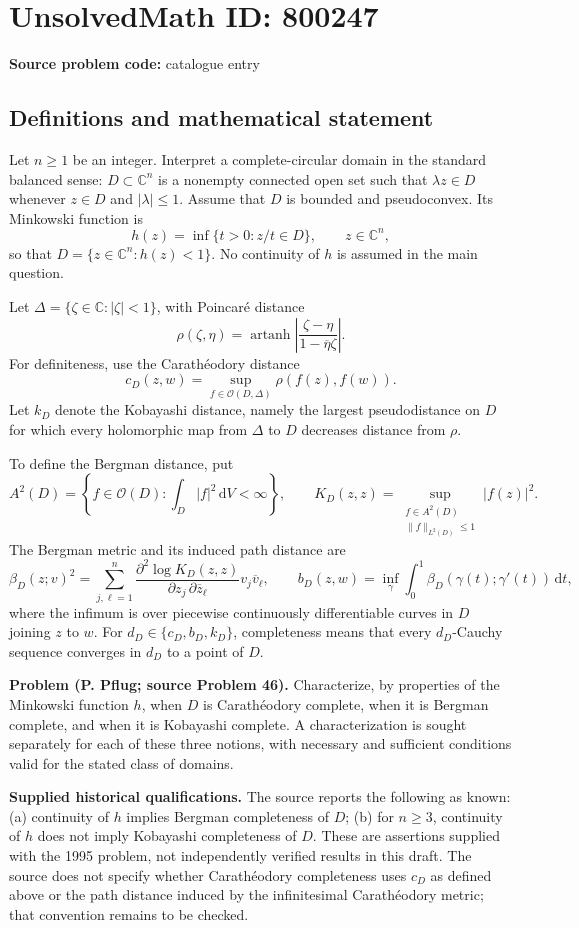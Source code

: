\documentclass[11pt]{article}
\newcommand{\C}{\mathbb{C}}
\begin{document}
\section*{UnsolvedMath ID: 800247}
\textbf{Source problem code:} catalogue entry
\subsection{Definitions and mathematical statement}
Let \(n\geq 1\) be an integer. Interpret a complete-circular domain in the standard balanced sense: \(D\subset\C^n\) is a nonempty connected open set such that \(\lambda z\in D\) whenever \(z\in D\) and \(|\lambda|\leq 1\). Assume that \(D\) is bounded and pseudoconvex. Its Minkowski function is
\[
h(z)=\inf\{t>0:z/t\in D\},\qquad z\in\C^n,
\]
so that \(D=\{z\in\C^n:h(z)<1\}\). No continuity of \(h\) is assumed in the main question.

Let \(\Delta=\{\zeta\in\C:|\zeta|<1\}\), with Poincar\'e distance
\[
\rho(\zeta,\eta)=\operatorname{artanh}\left|\frac{\zeta-\eta}{1-\overline\eta\zeta}\right|.
\]
For definiteness, use the Carath\'eodory distance
\[
c_D(z,w)=\sup_{f\in\mathcal O(D,\Delta)}\rho(f(z),f(w)).
\]
Let \(k_D\) denote the Kobayashi distance, namely the largest pseudodistance on \(D\) for which every holomorphic map from \(\Delta\) to \(D\) decreases distance from \(\rho\).

To define the Bergman distance, put
\[
A^2(D)=\left\{f\in\mathcal O(D):\int_D|f|^2\,\mathrm dV<\infty\right\},\qquad
K_D(z,z)=\sup_{\substack{f\in A^2(D)\\ \|f\|_{L^2(D)}\leq 1}}|f(z)|^2.
\]
The Bergman metric and its induced path distance are
\[
\beta_D(z;v)^2=\sum_{j,\ell=1}^n
\frac{\partial^2\log K_D(z,z)}{\partial z_j\,\partial\overline z_\ell}
 v_j\overline v_\ell,
\qquad
b_D(z,w)=\inf_\gamma\int_0^1\beta_D(\gamma(t);\gamma'(t))\,\mathrm dt,
\]
where the infimum is over piecewise continuously differentiable curves in \(D\) joining \(z\) to \(w\). For \(d_D\in\{c_D,b_D,k_D\}\), completeness means that every \(d_D\)-Cauchy sequence converges in \(d_D\) to a point of \(D\).

\textbf{Problem (P. Pflug; source Problem 46).} Characterize, by properties of the Minkowski function \(h\), when \(D\) is Carath\'eodory complete, when it is Bergman complete, and when it is Kobayashi complete. A characterization is sought separately for each of these three notions, with necessary and sufficient conditions valid for the stated class of domains.

\textbf{Supplied historical qualifications.} The source reports the following as known: (a) continuity of \(h\) implies Bergman completeness of \(D\); (b) for \(n\geq 3\), continuity of \(h\) does not imply Kobayashi completeness of \(D\). These are assertions supplied with the 1995 problem, not independently verified results in this draft. The source does not specify whether Carath\'eodory completeness uses \(c_D\) as defined above or the path distance induced by the infinitesimal Carath\'eodory metric; that convention remains to be checked.
\end{document}
